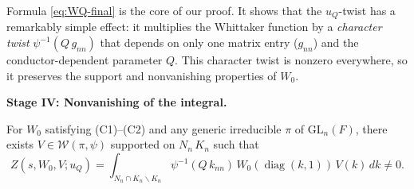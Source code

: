 \begin{remark}\label{rem:key-formula}
Formula \eqref{eq:WQ-final} is the core of our proof. It shows that the
$u_Q$-twist has a remarkably simple effect: it multiplies the Whittaker
function by a \emph{character twist} $\psi^{-1}(Q\,g_{nn})$ that depends on
only one matrix entry ($g_{nn}$) and the conductor-dependent parameter $Q$.
This character twist is nonzero everywhere, so it preserves the support and
nonvanishing properties of $W_0$.
\end{remark}

\bigskip
\noindent\textbf{Stage IV: Nonvanishing of the integral.}

\begin{theorem}[Nonvanishing]\label{thm:nonvanishing}
For $W_0$ satisfying (C1)--(C2) and any generic irreducible $\pi$ of
$\mathrm{GL}_n(F)$, there exists $V \in \mathcal{W}(\pi, \psi)$ supported
on $N_n\,K_n$ such that
\[
  Z(s, W_0, V; u_Q) = \int_{N_n \cap K_n \backslash K_n}
  \psi^{-1}(Q\,k_{nn})\,W_0(\operatorname{diag}(k,1))\,V(k)\,dk \neq 0.
\]
\end{theorem}

